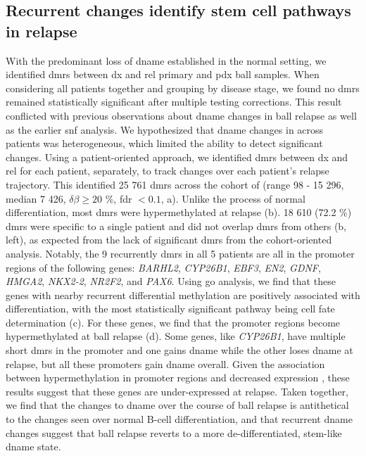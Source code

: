 \subsection{Recurrent  changes identify stem cell pathways in relapse}

With the predominant loss of \gls{dname} established in the normal setting, we identified \glspl{dmr} between \gls{dx} and \gls{rel} primary and \gls{pdx} \gls{ball} samples.
When considering all patients together and grouping by disease stage, we found no \glspl{dmr} remained statistically significant after multiple testing corrections.
This result conflicted with previous observations about \gls{dname} changes in \gls{ball} relapse \cite{leeEpigeneticRemodelingBcell2015,nordlundGenomewideSignaturesDifferential2013} as well as the earlier \gls{snf} analysis.
We hypothesized that \gls{dname} changes in across patients was heterogeneous, which limited the ability to detect significant changes.
Using a patient-oriented approach, we identified \glspl{dmr} between \gls{dx} and \gls{rel} for each patient, separately, to track changes over each patient's relapse trajectory.
This identified 25 761 \glspl{dmr} across the cohort of (range 98 - 15 296, median 7 426, $\delta \beta \ge 20$ \%, \gls{fdr} $< 0.1$, a).
Unlike the process of normal differentiation, most \glspl{dmr} were hypermethylated at relapse (b).
18 610 (72.2 \%) \glspl{dmr} were specific to a single patient and did not overlap \glspl{dmr} from others (b, left), as expected from the lack of significant \glspl{dmr} from the cohort-oriented analysis.
Notably, the 9 recurrently \glspl{dmr} in all 5 patients are all in the promoter regions of the following genes: \emph{BARHL2}, \emph{CYP26B1}, \emph{EBF3}, \emph{EN2}, \emph{GDNF}, \emph{HMGA2}, \emph{NKX2-2}, \emph{NR2F2}, and \emph{PAX6}.
Using \gls{go} analysis, we find that these genes with nearby recurrent differential methylation are positively associated with differentiation, with the most statistically significant pathway being cell fate determination (c).
For these genes, we find that the promoter regions become hypermethylated at \gls{ball} relapse (d).
Some genes, like \emph{CYP26B1}, have multiple short \glspl{dmr} in the promoter and one gains \gls{dname} while the other loses \gls{dname} at relapse, but all these promoters gain \gls{dname} overall.
Given the association between hypermethylation in promoter regions and decreased expression \cite{jonesFunctionsDNAMethylation2012}, these results suggest that these genes are under-expressed at relapse.
Taken together, we find that the changes to \gls{dname} over the course of \gls{ball} relapse is antithetical to the changes seen over normal B-cell differentiation, and that recurrent \gls{dname} changes suggest that \gls{ball} relapse reverts to a more de-differentiated, stem-like \gls{dname} state.

